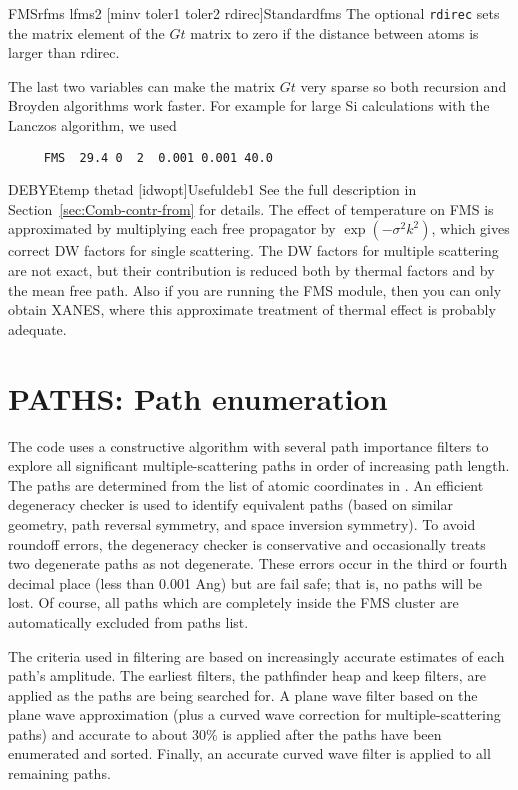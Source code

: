 \documentclass[11pt,oneside]{report} %
\begin{document}
\begin{Card}{FMS}{rfms  lfms2 [minv toler1 toler2 rdirec]}{Standard}{fms}
  The optional \texttt{rdirec} sets the matrix element of the $Gt$ matrix
to zero if the distance between atoms is larger than rdirec.

The last two variables can make the matrix $Gt$ very sparse so both recursion
and Broyden algorithms work faster. For example for large Si calculations
with the Lanczos algorithm, we used
 \begin{verbatim}
     FMS  29.4 0  2  0.001 0.001 40.0
 \end{verbatim}
\end{Card}


\begin{Card}{DEBYE}{temp thetad [idwopt]}{Useful}{deb1}
  See the full description in Section~\ref{sec:Comb-contr-from} for details.
  The effect of temperature on FMS is approximated by multiplying each free
  propagator by $\exp(-\sigma^2 k^2)$, which gives correct DW
  factors for single scattering. The DW factors for multiple
  scattering are not exact, but their contribution is reduced both by
  thermal factors and by the mean free path.  Also if you are running
  the FMS module, then you can only obtain XANES, where this approximate
  treatment of thermal effect is probably adequate.
\end{Card}


\section{PATHS: Path enumeration}
\label{sec:Path-enum-modul}

The code uses a constructive algorithm with several path importance
filters to explore all significant multiple-scattering paths in order
of increasing path length.  The paths are determined from the list of
atomic coordinates in .  An efficient degeneracy
checker is used to identify equivalent paths (based on similar
geometry, path reversal symmetry, and space inversion symmetry). To
avoid roundoff errors, the degeneracy checker is conservative and
occasionally treats two degenerate paths as not degenerate.
These errors occur in the third or fourth decimal place (less than
0.001 Ang) but are fail safe; that is, no paths will be lost.  Of course,
all paths which are completely inside the FMS cluster are automatically
excluded from paths list.

The criteria used in filtering are based on increasingly accurate
estimates of each path's amplitude.  The earliest filters, the
pathfinder heap and keep filters, are applied as the paths are being
searched for.  A plane wave filter based on the plane wave approximation
(plus a curved wave correction for multiple-scattering paths) and
accurate to about 30\% is applied after the paths have been enumerated
and sorted.  Finally, an accurate curved wave filter is applied to
all remaining paths.
\end{document}
